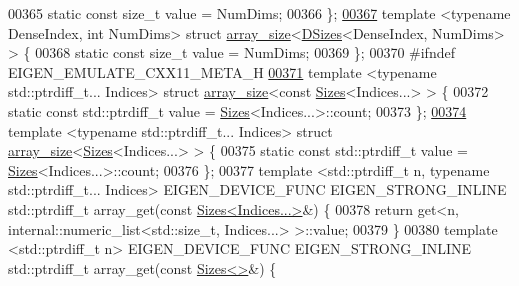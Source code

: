 \begin{DoxyCode}
00365   \textcolor{keyword}{static} \textcolor{keyword}{const} \textcolor{keywordtype}{size\_t} value = NumDims;
00366 \};
\hyperlink{struct_eigen_1_1internal_1_1array__size_3_01_d_sizes_3_01_dense_index_00_01_num_dims_01_4_01_4}{00367} \textcolor{keyword}{template} <\textcolor{keyword}{typename} DenseIndex, \textcolor{keywordtype}{int} NumDims> \textcolor{keyword}{struct }\hyperlink{struct_eigen_1_1internal_1_1array__size}{array\_size}<\hyperlink{struct_eigen_1_1_d_sizes}{DSizes}<DenseIndex, NumDims> >
       \{
00368   \textcolor{keyword}{static} \textcolor{keyword}{const} \textcolor{keywordtype}{size\_t} value = NumDims;
00369 \};
00370 \textcolor{preprocessor}{#ifndef EIGEN\_EMULATE\_CXX11\_META\_H}
\hyperlink{struct_eigen_1_1internal_1_1array__size_3_01const_01_sizes_3_01_indices_8_8_8_01_4_01_4}{00371} \textcolor{keyword}{template} <\textcolor{keyword}{typename} std::ptrdiff\_t... Indices> \textcolor{keyword}{struct }\hyperlink{struct_eigen_1_1internal_1_1array__size}{array\_size}<const 
      \hyperlink{struct_eigen_1_1_sizes}{Sizes}<Indices...> > \{
00372 \textcolor{keyword}{static} \textcolor{keyword}{const} std::ptrdiff\_t value = \hyperlink{struct_eigen_1_1_sizes}{Sizes}<Indices...>::count;
00373 \};
\hyperlink{struct_eigen_1_1internal_1_1array__size_3_01_sizes_3_01_indices_8_8_8_01_4_01_4}{00374} \textcolor{keyword}{template} <\textcolor{keyword}{typename} std::ptrdiff\_t... Indices> \textcolor{keyword}{struct }\hyperlink{struct_eigen_1_1internal_1_1array__size}{array\_size}<\hyperlink{struct_eigen_1_1_sizes}{Sizes}<Indices...> > \{
00375 \textcolor{keyword}{static} \textcolor{keyword}{const} std::ptrdiff\_t value = \hyperlink{struct_eigen_1_1_sizes}{Sizes}<Indices...>::count;
00376 \};
00377 \textcolor{keyword}{template} <std::ptrdiff\_t n, \textcolor{keyword}{typename} std::ptrdiff\_t... Indices> EIGEN\_DEVICE\_FUNC EIGEN\_STRONG\_INLINE 
      std::ptrdiff\_t array\_get(\textcolor{keyword}{const} \hyperlink{struct_eigen_1_1_sizes}{Sizes<Indices...>}&) \{
00378   \textcolor{keywordflow}{return} \textcolor{keyword}{get}<n, internal::numeric\_list<std::size\_t, Indices...> >::value;
00379 \}
00380 \textcolor{keyword}{template} <std::ptrdiff\_t n> EIGEN\_DEVICE\_FUNC EIGEN\_STRONG\_INLINE std::ptrdiff\_t array\_get(\textcolor{keyword}{const} 
      \hyperlink{struct_eigen_1_1_sizes}{Sizes<>}&) \{

\end{DoxyCode}
